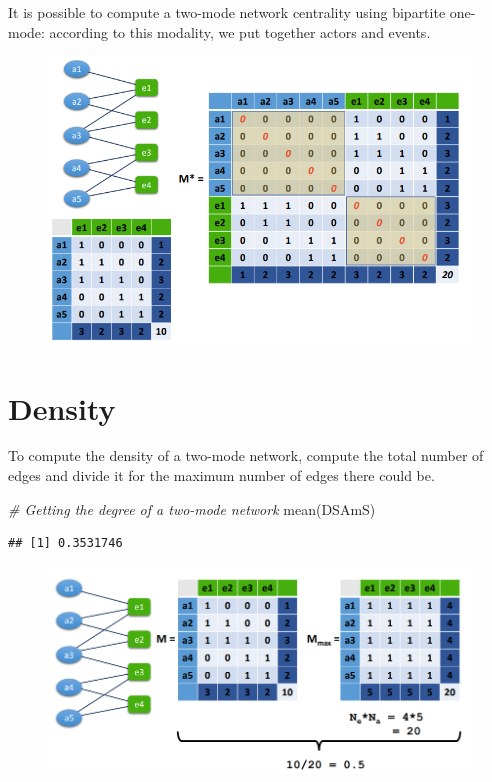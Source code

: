 \documentclass[
  notitlepage,
  onecolumn,
  openany]{book}
\newenvironment{Shaded}{\begin{snugshade}}{\end{snugshade}}
\newcommand{\CommentTok}[1]{\textcolor[rgb]{0.56,0.35,0.01}{\textit{#1}}}
\newcommand{\FunctionTok}[1]{\textcolor[rgb]{0.00,0.00,0.00}{#1}}
\newcommand{\NormalTok}[1]{#1}
\begin{document}
It is possible to compute a two-mode network centrality using bipartite one-mode: according to this modality, we put together actors and events.

\begin{figure}[h!]

{\centering \includegraphics[width=0.5\linewidth]{images/10-Two mode networks/Untitled 2} 

}

\end{figure}

\hypertarget{density-1}{%
\section{Density}\label{density-1}}

To compute the density of a two-mode network, compute the total number of edges and divide it for the maximum number of edges there could be.

\begin{Shaded}
\begin{Highlighting}[]
\CommentTok{\# Getting the degree of a two{-}mode network}
\FunctionTok{mean}\NormalTok{(DSAmS)}
\end{Highlighting}
\end{Shaded}

\begin{verbatim}
## [1] 0.3531746
\end{verbatim}

\begin{figure}[h!]

{\centering \includegraphics[width=0.5\linewidth]{images/10-Two mode networks/Untitled 3} 

}

\end{figure}
\end{document}
